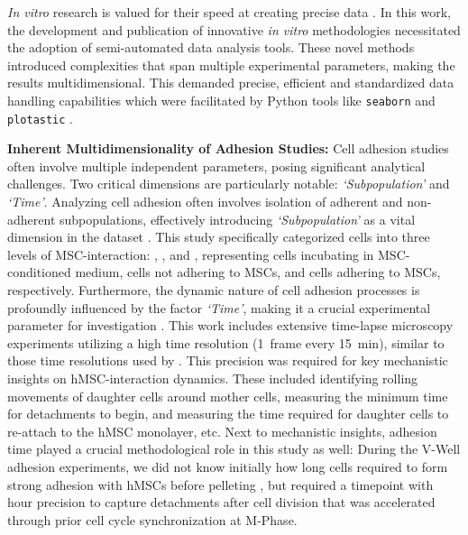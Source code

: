 %
\label{sec:discussion_semi_automated_analysis}%
\textit{In vitro} research is valued for their speed at creating precise data
\cite{moleiroCriticalAnalysisAvailable2017}. In this work, the development and
publication of innovative \textit{in vitro} methodologies necessitated the adoption of
semi-automated data analysis tools. These novel methods introduced complexities
that span multiple experimental parameters, making the results multidimensional.
This demanded precise, efficient and standardized data handling capabilities
which were facilitated by Python tools like \texttt{seaborn} and
\texttt{plotastic} \cite{waskomSeabornStatisticalData2021,kuricPlotasticBridgingPlotting2024}.


\textbf{Inherent Multidimensionality of Adhesion Studies:}
Cell adhesion studies often involve multiple independent parameters, posing
significant analytical challenges. Two critical dimensions are particularly
notable: \emph{`Subpopulation'} and \emph{`Time'}. Analyzing cell adhesion often
involves isolation of adherent and non-adherent subpopulations, effectively
introducing \textit{`Subpopulation'} as a vital dimension in the dataset
\cite{dziadowiczBoneMarrowStromaInduced2022}. This study specifically
categorized cells into three levels of MSC-interaction: \CMina, \nMAina, and
\MAina, representing \INA cells incubating in MSC-conditioned medium, \INA cells
not adhering to MSCs, and \INA cells adhering to MSCs, respectively.
Furthermore, the dynamic nature of cell adhesion processes is profoundly
influenced by the factor \emph{`Time'}, making it a crucial experimental
parameter for investigation \cite{reblTimedependentMetabolicActivity2010,
    mckayCellcellAdhesionMolecules1997,
    bolado-carrancioPeriodicPropagatingWaves2020a}. This work includes extensive
time-lapse microscopy experiments utilizing a high time resolution
(\SI{1}{frame} every \SI{15}{\minute}), similar to those time resolutions used
by \citet{purschkePhototoxicityHoechst333422010}. This precision was required
for key mechanistic insights on hMSC-\INA interaction dynamics. These included
identifying rolling movements of \nMAina daughter cells around \MAina mother
cells, measuring the minimum time for \INA detachments to begin, and measuring
the time required for daughter cells to re-attach to the hMSC monolayer, etc.
Next to mechanistic insights, adhesion time played a crucial methodological role
in this study as well: During the V-Well adhesion experiments, we did not know
initially how long \INA cells required to form strong adhesion with hMSCs before
pelleting \nMAina, but required a timepoint with hour precision to capture
detachments after cell division that was accelerated through prior cell cycle
synchronization at M-Phase.

